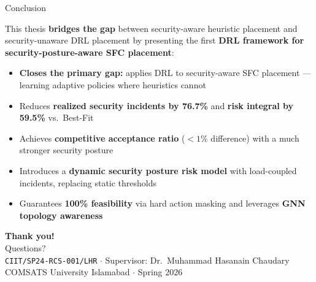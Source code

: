 \begin{frame}{Conclusion}
  \begin{tcolorbox}[colback=cuired!8, colframe=cuired, title=Summary, fonttitle=\bfseries]
    This thesis \textbf{bridges the gap} between security-aware heuristic placement and security-unaware DRL placement by presenting the first \textbf{DRL framework for security-posture-aware SFC placement}:
    \begin{itemize}
      \item \textbf{Closes the primary gap:} applies DRL to security-aware SFC placement --- learning adaptive policies where heuristics cannot
      \item Reduces \textbf{realized security incidents by 76.7\%} and \textbf{risk integral by 59.5\%} vs.\ Best-Fit
      \item Achieves \textbf{competitive acceptance ratio} ($<1\%$ difference) with a much stronger security posture
      \item Introduces a \textbf{dynamic security posture risk model} with load-coupled incidents, replacing static thresholds
      \item Guarantees \textbf{100\% feasibility} via hard action masking and leverages \textbf{GNN topology awareness}
    \end{itemize}
  \end{tcolorbox}
  \vspace{10pt}
  \centering
  \large\textbf{Thank you!}\\[6pt]
  \normalsize Questions?\\[4pt]
  \small\texttt{CIIT/SP24-RCS-001/LHR} $\cdot$ Supervisor: Dr.\ Muhammad Hasanain Chaudary\\
  \small COMSATS University Islamabad $\cdot$ Spring 2026
\end{frame}
